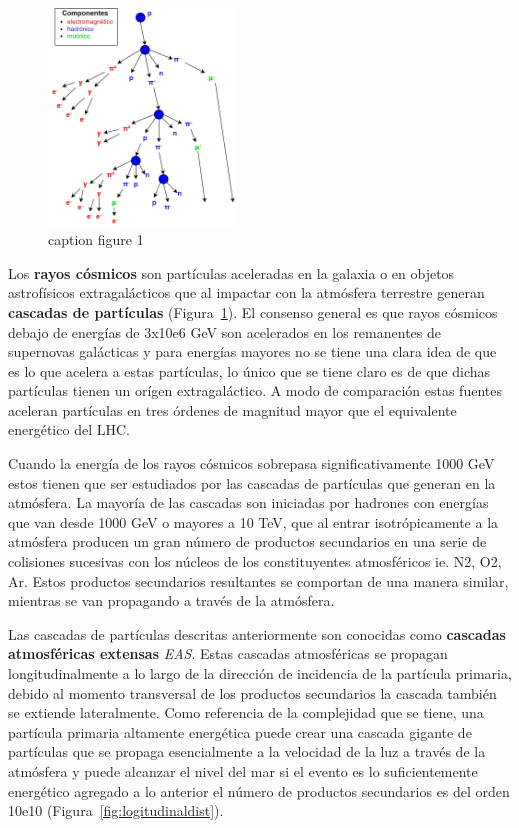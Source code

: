 \begin{figure}
    \centering
    \includegraphics[width=50mm,scale=0.5]{Figures/showercomponents-jpg.jpg}
    \decoRule
    \caption[showercomponents]{caption figure 1}
    \label{fig:showercomponents}
\end{figure}

Los \textbf{rayos cósmicos} son partículas aceleradas en la galaxia o en objetos astrofísicos extragalácticos que al impactar con la atmósfera terrestre generan \textbf{cascadas de partículas} (Figura~\ref{fig:showercomponents}). El consenso general es que rayos cósmicos debajo de energías de 3x10e6 GeV son acelerados en los remanentes de supernovas galácticas y para energías mayores no se tiene una clara idea de que es lo que acelera a estas partículas, lo único que se tiene claro es de que dichas partículas tienen un orígen extragaláctico. A modo de comparación estas fuentes aceleran partículas en tres órdenes de magnitud mayor que el equivalente energético del LHC.

Cuando la energía de los rayos cósmicos sobrepasa significativamente 1000 GeV estos tienen que ser estudiados por las cascadas de partículas que generan en la atmósfera. La mayoría de las cascadas son iniciadas por hadrones con energías que van desde 1000  GeV o mayores a 10 TeV, que al entrar isotrópicamente a la atmósfera producen un gran número de productos secundarios en una serie de colisiones sucesivas con los núcleos de los constituyentes atmosféricos ie. N2, O2, Ar. Estos productos secundarios resultantes se comportan de una manera similar, mientras se van propagando a través de la atmósfera.

Las cascadas de partículas descritas anteriormente son conocidas como \textbf{cascadas atmosféricas extensas} \emph{EAS}. Estas cascadas atmosféricas se propagan longitudinalmente a lo largo de la dirección de incidencia de la partícula primaria, debido al momento transversal de los productos secundarios la cascada también se extiende lateralmente. Como referencia de la complejidad que se tiene, una partícula primaria altamente energética puede crear una cascada gigante de partículas que se propaga esencialmente a la velocidad de la luz a través de la atmósfera y puede alcanzar el nivel del mar si el evento es lo suficientemente energético agregado a lo anterior el número de productos secundarios es del orden 10e10 (Figura~\ref{fig:logitudinaldist}).

